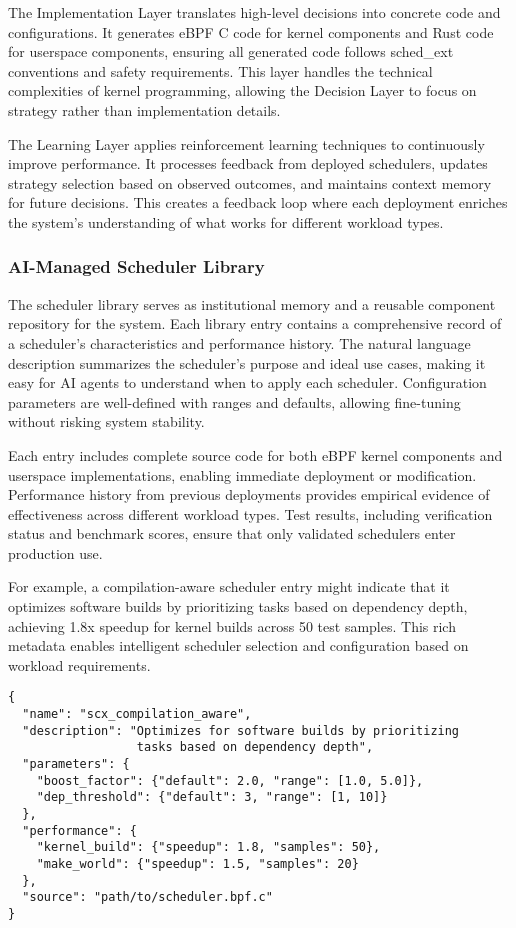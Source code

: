 The Implementation Layer translates high-level decisions into concrete code and configurations. It generates eBPF C code for kernel components and Rust code for userspace components, ensuring all generated code follows sched\_ext conventions and safety requirements. This layer handles the technical complexities of kernel programming, allowing the Decision Layer to focus on strategy rather than implementation details.

The Learning Layer applies reinforcement learning techniques to continuously improve performance. It processes feedback from deployed schedulers, updates strategy selection based on observed outcomes, and maintains context memory for future decisions. This creates a feedback loop where each deployment enriches the system's understanding of what works for different workload types.

\subsubsection{AI-Managed Scheduler Library}
The scheduler library serves as institutional memory and a reusable component repository for the system. Each library entry contains a comprehensive record of a scheduler's characteristics and performance history. The natural language description summarizes the scheduler's purpose and ideal use cases, making it easy for AI agents to understand when to apply each scheduler. Configuration parameters are well-defined with ranges and defaults, allowing fine-tuning without risking system stability.

Each entry includes complete source code for both eBPF kernel components and userspace implementations, enabling immediate deployment or modification. Performance history from previous deployments provides empirical evidence of effectiveness across different workload types. Test results, including verification status and benchmark scores, ensure that only validated schedulers enter production use.

For example, a compilation-aware scheduler entry might indicate that it optimizes software builds by prioritizing tasks based on dependency depth, achieving 1.8x speedup for kernel builds across 50 test samples. This rich metadata enables intelligent scheduler selection and configuration based on workload requirements.

\begin{verbatim}
{
  "name": "scx_compilation_aware",
  "description": "Optimizes for software builds by prioritizing
                  tasks based on dependency depth",
  "parameters": {
    "boost_factor": {"default": 2.0, "range": [1.0, 5.0]},
    "dep_threshold": {"default": 3, "range": [1, 10]}
  },
  "performance": {
    "kernel_build": {"speedup": 1.8, "samples": 50},
    "make_world": {"speedup": 1.5, "samples": 20}
  },
  "source": "path/to/scheduler.bpf.c"
}
\end{verbatim}

